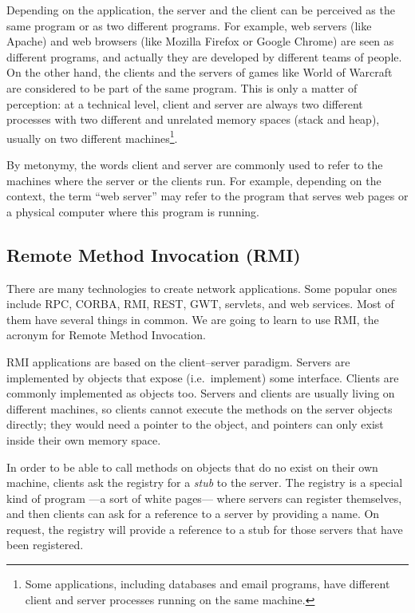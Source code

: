 Depending on the application, the server and the client can be
perceived as the same program or as two different programs. 
For example, web servers (like
Apache) and web browsers (like Mozilla Firefox or Google Chrome) are
seen as different programs, and actually they are developed by
different teams of people. On the other hand, the clients and the
servers of games like World of Warcraft are considered to be part of
the same program. This is only a matter of perception: at a technical
level, client and server are always two different processes with two
different and unrelated memory spaces (stack and heap), usually on two
different machines\footnote{Some applications, including databases and
email programs, have different client and server processes running on
the same machine.}. 

By metonymy, the words client and server are commonly used to refer to
the machines where the server or the clients run. For example,
depending on the context, the term ``web server'' may refer to the
program that serves web pages or a physical computer where this
program is running. 

\subsection{Remote Method Invocation (RMI)}
\label{sec:remote-meth-invoc}

There are many technologies to create network applications. Some 
popular ones include RPC, CORBA, RMI, REST, GWT, servlets, and web
services. Most of them have several things in common. We are going to
learn to use RMI, the acronym for Remote Method Invocation. 

RMI applications are based on the client--server paradigm. Servers are
implemented by objects that expose (i.e.~implement) some
interface. Clients are commonly implemented as objects too. Servers
and clients are usually living on different machines, so clients
cannot execute the methods on the server objects directly; they would
need a pointer to the object, and pointers can only exist inside their
own memory space. 

In order to be able to call methods on objects that do no exist on
their own machine, clients ask the registry for a \emph{stub} to the
server. The registry is a special kind of program ---a sort of white
pages--- where servers can register themselves, and then clients can
ask for a reference to a server by providing a name. 
On request, the registry will
provide a reference to a stub for those servers that have been registered. 

